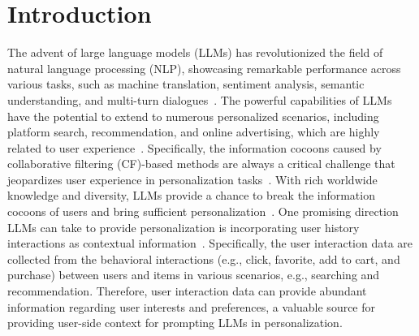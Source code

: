 \section{Introduction}
The advent of large language models (LLMs) has revolutionized the field of natural language processing (NLP), showcasing remarkable performance across various tasks, such as machine translation, sentiment analysis, semantic understanding, and multi-turn dialogues~\cite{OpenAI2023GPT4,touvron2023llama,yang2024qwen2,liu2024deepseek}. 
The powerful capabilities of LLMs have the potential to extend to numerous personalized scenarios, including platform search, recommendation, and online advertising, which are highly related to user experience~\cite{guu2020retrieval,bao2023tallrec,muhamed2021ctr}. Specifically, the information cocoons caused by collaborative filtering (CF)-based methods are always a critical challenge that jeopardizes user experience in personalization tasks~\cite{pariser2011filter,nguyen2014exploring}.
With rich worldwide knowledge and diversity, LLMs provide a chance to break the information cocoons of users and bring sufficient personalization~\cite{xu2024prompting,zhao2023recommender,zhang2023recommendation,wu2024survey}. One promising direction LLMs can take to provide personalization is incorporating user history interactions as contextual information~\cite{liu2023chatgpt,petrov2023generative,kang2023llms,geng2022recommendation,lyu2023llm}. Specifically, the user interaction data are collected from the behavioral interactions (e.g., click, favorite, add to cart, and purchase) between users and items in various scenarios, e.g., searching and recommendation. Therefore, user interaction data can provide abundant information regarding user interests and preferences, a valuable source for providing user-side context for prompting LLMs in personalization. 

